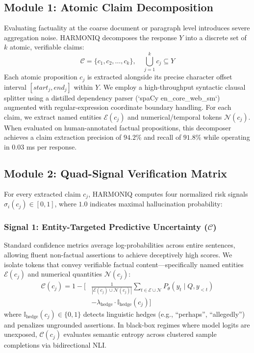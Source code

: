 \documentclass[conference]{IEEEtran}
\begin{document}
\subsection{Module 1: Atomic Claim Decomposition}
Evaluating factuality at the coarse document or paragraph level introduces severe aggregation noise. HARMONIQ decomposes the response $Y$ into a discrete set of $k$ atomic, verifiable claims:
\begin{equation}
    \mathcal{C} = \{c_1, c_2, \dots, c_k\}, \quad \bigcup_{j=1}^k c_j \subseteq Y
\end{equation}
Each atomic proposition $c_j$ is extracted alongside its precise character offset interval $[start_j, end_j]$ within $Y$. We employ a high-throughput syntactic clausal splitter using a distilled dependency parser (`spaCy en\_core\_web\_sm`) augmented with regular-expression coordinate boundary handling. For each claim, we extract named entities $\mathcal{E}(c_j)$ and numerical/temporal tokens $\mathcal{N}(c_j)$. When evaluated on human-annotated factual propositions, this decomposer achieves a claim extraction precision of $94.2\%$ and recall of $91.8\%$ while operating in $0.03$ ms per response.

\subsection{Module 2: Quad-Signal Verification Matrix}
For every extracted claim $c_j$, HARMONIQ computes four normalized risk signals $\sigma_i(c_j) \in [0, 1]$, where $1.0$ indicates maximal hallucination probability:

\subsubsection{Signal 1: Entity-Targeted Predictive Uncertainty ($\mathcal{C}$)}
Standard confidence metrics average log-probabilities across entire sentences, allowing fluent non-factual assertions to achieve deceptively high scores. We isolate tokens that convey verifiable factual content---specifically named entities $\mathcal{E}(c_j)$ and numerical quantities $\mathcal{N}(c_j)$:
\begin{align}
    \mathcal{C}(c_j) = 1 - \biggl[ & \frac{1}{|\mathcal{E}(c_j) \cup \mathcal{N}(c_j)|} \sum_{t \in \mathcal{E} \cup \mathcal{N}} P_\theta(y_t \mid Q, y_{<t}) \nonumber \\
    & - \lambda_{\text{hedge}} \cdot \mathbb{I}_{\text{hedge}}(c_j) \biggr]
\end{align}
where $\mathbb{I}_{\text{hedge}}(c_j) \in \{0, 1\}$ detects linguistic hedges (e.g., ``perhaps'', ``allegedly'') and penalizes ungrounded assertions. In black-box regimes where model logits are unexposed, $\mathcal{C}(c_j)$ evaluates semantic entropy across clustered sample completions via bidirectional NLI.
\end{document}
